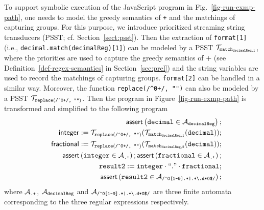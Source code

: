 To support symbolic execution of the JavaScript program in Fig.~\ref{fig-run-exmp-path}, one needs to model the greedy semantics of {\tt +} and the matchings of capturing groups. For this purpose, we introduce prioritized streaming string transducers (PSST; cf. Section~\ref{sect:psst}). Then the extraction of {\tt format[1]} (i.e., {\tt decimal.match(decimalReg)[1]}) can be modeled by a PSST $\mathcal{T}_{\tt match_{decimalReg,1}}$, where the priorities are used to capture the greedy semantics of $+$ (see Definition~\ref{def-regex-semantics} in Section~\ref{sec:prel}) and the string variables are used to record the matchings of capturing groups. %
{\tt format[2]} can be handled in a similar way. Moreover, the function {\tt replace(/\^{}0+/, "")} can also be modeled by a PSST $\mathcal{T}_{\scriptsize\tt replace(\mbox{\tt /\^{}0+/, ""})}$. Then the program in Figure~\ref{fig-run-exmp-path} is transformed and simplified to the following program
\begin{eqnarray}\label{eqn:exmp}
& & \textsf{assert}\left(\tt decimal \in \mathcal{A}_{decimalReg}\right);\nonumber \\
& & \sf integer  := \tt  \mathcal{T}_{\tt replace(\mbox{\scriptsize \tt /\^{}0+/, ""})}(\mathcal{T}_{\tt match_{decimalReg,1}}(decimal));\nonumber \\
& & \sf fractional  := \tt  \mathcal{T}_{\scriptsize\tt replace(\mbox{\tt /\^{}0+/, ""})}(\mathcal{T}_{\tt match_{decimalReg,2}}(decimal));\nonumber \\
&&  \textsf{assert}\left(\tt integer \in \mathcal{A}_{\scriptsize\mbox{\tt.+}}\right); 
\textsf{assert}\left(\tt fractional \in \mathcal{A}_{\scriptsize\mbox{\tt.+}}\right); \nonumber\\
 && \tt result2 := integer \cdot ``." \cdot fractional; \nonumber\\
 && \textsf{assert}\left(\tt result2 \in \mathcal{A}_{\scriptsize\mbox{\tt /\^{}0[1-9].*|.*{\scriptsize\textbackslash}.d*0\$/}}\right); 
\end{eqnarray}
where $\mathcal{A}_{\scriptsize\mbox{\tt.+}}$, $\mathcal{A}_{\tt decimalReg}$ and $\mathcal{A}_{\scriptsize\mbox{\tt /\^{}0[1-9].*|.*{\scriptsize\textbackslash}.d*0\$/}}$ are three finite automata corresponding to the three regular expressions respectively.

